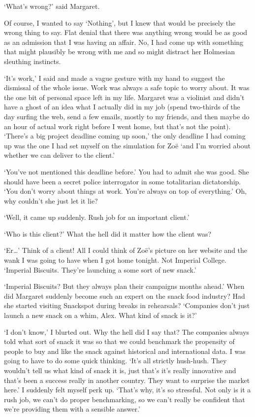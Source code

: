 `What's wrong?' said Margaret.

Of course, I wanted to say `Nothing', but I knew that would be
precisely the wrong thing to say. Flat denial that there was
{\twelveit anything\/} wrong would be as good as an admission that I
{\twelveit\/} was having an affair. No, I had come up with something
that might plausibly be wrong with me and so might distract her Holmesian
sleuthing instincts.

`It's work,' I said and made a vague gesture with my hand to suggest
the dismissal of the whole issue. Work was always a safe topic to
worry about. It was the one bit of personal space left in my life.
Margaret was a violinist and didn't have a ghost of an idea what I
actually did in my job (spend two-thirds of the day surfing the web,
send a few emails, mostly to my friends, and then maybe do an hour
of actual work right before I went home, but that's not the point).
`There's a big project deadline coming up soon,' the only deadline I
had coming up was the one I had set myself on the simulation for
Zoë `and I'm worried about whether we can deliver to the
client.'

`You've not mentioned this deadline before.' You had to admit she
was good. She should have been a secret police interrogator in some
totalitarian dictatorship. `You don't worry about things at work.
You're always on top of everything.' Oh, why couldn't she just let
it lie?

`Well, it came up suddenly. Rush job for an important client.'

`Who is this client?' What the hell did it matter how the client
was?

`Er\dots' Think of a client! All I could think of Zoë's picture
on her website and the wank I was going to have when I got home
tonight. Not Imperial College. `Imperial Biscuits. They're launching a
some sort of new snack.'

`Imperial Biscuits? But they always plan their campaigns months
ahead.' When did Margaret suddenly become such an expert on the
snack food industry? Had she started visiting Snackspot during breaks in
rehearsals? `Companies don't just launch a new snack on a whim,
Alex. What kind of snack is it?'

`I don't know,' I blurted out. Why the hell did I say that? The
companies always told what sort of snack it was so that we could
benchmark the propensity of people to buy and like the snack against
historical and international data. I was going to have to do some
quick thinking. `It's all strictly hush-hush. They wouldn't tell us
what kind of snack it is, just that's it's really innovative and
that's been a success really in another country. They want to
surprise the market here.' I suddenly felt myself perk up.
`{\twelveit That's\/} why, it's so stressful. Not only is it a rush
job, we can't do proper benchmarking, so we can't really be
confident that we're providing them with a sensible answer.'


